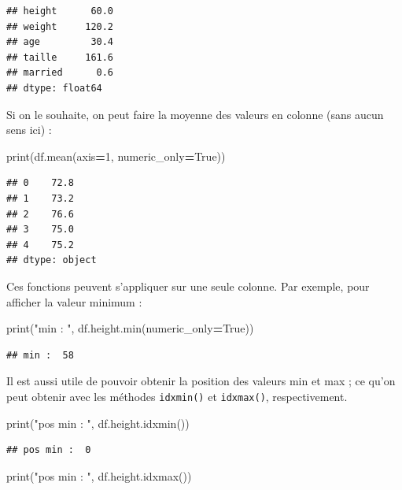 \documentclass[
  12pt,
]{book}
\newenvironment{Shaded}{\begin{snugshade}}{\end{snugshade}}
\newcommand{\BuiltInTok}[1]{#1}
\newcommand{\DecValTok}[1]{\textcolor[rgb]{0.00,0.00,0.81}{#1}}
\newcommand{\NormalTok}[1]{#1}
\newcommand{\OperatorTok}[1]{\textcolor[rgb]{0.81,0.36,0.00}{\textbf{#1}}}
\newcommand{\StringTok}[1]{\textcolor[rgb]{0.31,0.60,0.02}{#1}}
\newcommand{\VariableTok}[1]{\textcolor[rgb]{0.00,0.00,0.00}{#1}}
\numberwithin{equation}{section}
\numberwithin{countremarque}{section}
\begin{document}
\begin{lstlisting}
## height      60.0
## weight     120.2
## age         30.4
## taille     161.6
## married      0.6
## dtype: float64
\end{lstlisting}

Si on le souhaite, on peut faire la moyenne des valeurs en colonne (sans aucun sens ici) :

\begin{Shaded}
\begin{Highlighting}[]
\BuiltInTok{print}\NormalTok{(df.mean(axis}\OperatorTok{=}\DecValTok{1}\NormalTok{, numeric\_only}\OperatorTok{=}\VariableTok{True}\NormalTok{))}
\end{Highlighting}
\end{Shaded}

\begin{lstlisting}
## 0    72.8
## 1    73.2
## 2    76.6
## 3    75.0
## 4    75.2
## dtype: object
\end{lstlisting}

Ces fonctions peuvent s'appliquer sur une seule colonne. Par exemple, pour afficher la valeur minimum :

\begin{Shaded}
\begin{Highlighting}[]
\BuiltInTok{print}\NormalTok{(}\StringTok{"min : "}\NormalTok{, df.height.}\BuiltInTok{min}\NormalTok{(numeric\_only}\OperatorTok{=}\VariableTok{True}\NormalTok{))}
\end{Highlighting}
\end{Shaded}

\begin{lstlisting}
## min :  58
\end{lstlisting}

Il est aussi utile de pouvoir obtenir la position des valeurs min et max ; ce qu'on peut obtenir avec les méthodes \texttt{idxmin()} et \texttt{idxmax()}, respectivement.

\begin{Shaded}
\begin{Highlighting}[]
\BuiltInTok{print}\NormalTok{(}\StringTok{"pos min : "}\NormalTok{, df.height.idxmin())}
\end{Highlighting}
\end{Shaded}

\begin{lstlisting}
## pos min :  0
\end{lstlisting}

\begin{Shaded}
\begin{Highlighting}[]
\BuiltInTok{print}\NormalTok{(}\StringTok{"pos min : "}\NormalTok{, df.height.idxmax())}
\end{Highlighting}
\end{Shaded}
\end{document}
